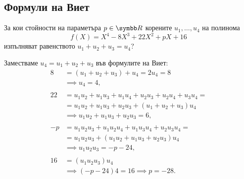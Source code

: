 \documentclass[
  headings=standardclasses,
  bibliography=totocnumbered,
]{scrartcl}
\begin{document}
\subsection{Формули на Виет}

\begin{exercise}
  За кои стойности на параметъра \( p \in \R \) корените \( u_1, \ldots, u_4 \) на полинома
  \begin{equation*}
    f(X) = X^4 - 8X^3 + 22X^2 + pX + 16
  \end{equation*}
  изпълняват равенството \( u_1 + u_2 + u_3 = u_4 \)?
\end{exercise}
\begin{solution}
  Заместваме \( u_4 = u_1 + u_2 + u_3 \) във формулите на Виет:
  \begin{align*}
    8 &= (u_1 + u_2 + u_3) + u_4 = 2u_4 = 8
    \\&\implies
    u_4 = 4,
    \\ \\
    22 &= u_1 u_2 + u_1 u_3 + u_1 u_4 + u_2 u_3 + u_2 u_4 + u_3 u_4 = \\ &= u_1 u_2 + u_1 u_3 + u_2 u_3 + (u_1 + u_2 + u_3) u_4
    \\&\implies
    u_1 u_2 + u_1 u_3 + u_2 u_3 = 6,
    \\ \\
    -p &= u_1 u_2 u_3 + u_1 u_2 u_4 + u_1 u_3 u_4 + u_2 u_3 u_4 = \\ &= u_1 u_2 u_3 + (u_1 u_2 + u_1 u_3 + u_2 u_3) u_4 \\&\implies
    u_1 u_2 u_3 = -p - 24,
    \\ \\
    16 &= (u_1 u_2 u_3) u_4
    \\&\implies
    (-p - 24) 4 = 16 \implies p = -28.
  \end{align*}
\end{solution}

\printbibliography
\end{document}
